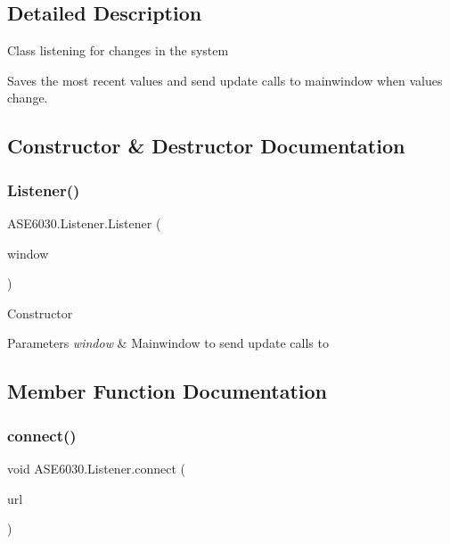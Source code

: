 \subsection{Detailed Description}
Class listening for changes in the system 

Saves the most recent values and send update calls to mainwindow when values change. 

\subsection{Constructor \& Destructor Documentation}
\mbox{\label{class_a_s_e6030_1_1_listener_af7626538cc99c4945ea517dbf6eaa249}} 
\subsubsection{\texorpdfstring{Listener()}{Listener()}}
{\footnotesize\ttfamily A\+S\+E6030.\+Listener.\+Listener (\begin{DoxyParamCaption}\item[{\hyperlink{class_a_s_e6030_1_1_main_window}{Main\+Window}}]{window }\end{DoxyParamCaption})\hspace{0.3cm}{\ttfamily [inline]}}



Constructor 


\begin{DoxyParams}{Parameters}
{\em window} & Mainwindow to send update calls to\\
\hline
\end{DoxyParams}


\subsection{Member Function Documentation}
\mbox{\label{class_a_s_e6030_1_1_listener_a8da1c65da8448e79897a2c06c31e6ca0}} 
\subsubsection{\texorpdfstring{connect()}{connect()}}
{\footnotesize\ttfamily void A\+S\+E6030.\+Listener.\+connect (\begin{DoxyParamCaption}\item[{string}]{url }\end{DoxyParamCaption})\hspace{0.3cm}{\ttfamily [inline]}}




